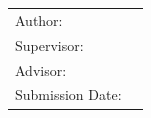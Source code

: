 \begin{titlepage}
  \centering

  \oTUM{38mm}

  \vspace{5mm}
  \begin{spacing}{1.5}
    {\huge\MakeUppercase{\getFaculty{}}}\\
  \end{spacing}

  \vspace{5mm}
  {\large\MakeUppercase{\getUniversity{}}}\\

  \vspace{20mm}
  {\Large \getDoctype{}}

  \vspace{15mm}
  {\huge\bfseries \getTitle{}}

  \vspace{10mm}
  {\huge\bfseries \getTitleGer{}}

  \vspace{10mm}
  \begin{tabular}{l l}
    Author:          & \getAuthor{}         \\
    Supervisor:      & \getSupervisor{}     \\
    Advisor:         & \getAdvisor{}        \\
    Submission Date: & \getSubmissionDate{} \\
  \end{tabular}

\end{titlepage}
\cleardoublepage{}
